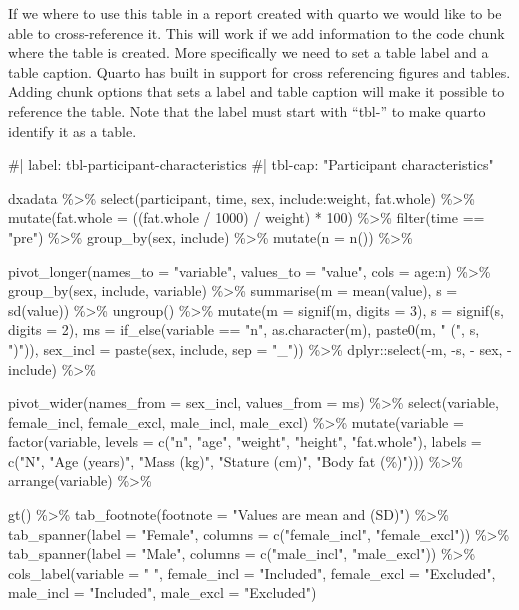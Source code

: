 \documentclass[
  11pt,
  letterpaper,
]{scrbook}
\newenvironment{Shaded}{\begin{snugshade}}{\end{snugshade}}
\newcommand{\NormalTok}[1]{\textcolor[rgb]{0.00,0.23,0.31}{#1}}
\begin{document}
If we where to use this table in a report created with quarto we would
like to be able to cross-reference it. This will work if we add
information to the code chunk where the table is created. More
specifically we need to set a table label and a table caption. Quarto
has built in support for cross referencing figures and tables. Adding
chunk options that sets a label and table caption will make it possible
to reference the table. Note that the label must start with ``tbl-'' to
make quarto identify it as a table.

\begin{Shaded}
\begin{Highlighting}[numbers=left,,]
\NormalTok{\#| label: tbl{-}participant{-}characteristics}
\NormalTok{\#| tbl{-}cap: "Participant characteristics"}

\NormalTok{dxadata \%\textgreater{}\%}
\NormalTok{select(participant, time, sex, include:weight, fat.whole) \%\textgreater{}\%}
\NormalTok{mutate(fat.whole = ((fat.whole / 1000) / weight) * 100) \%\textgreater{}\%}
\NormalTok{filter(time == "pre") \%\textgreater{}\%}
\NormalTok{group\_by(sex, include) \%\textgreater{}\%}
\NormalTok{mutate(n = n()) \%\textgreater{}\%}

\NormalTok{pivot\_longer(names\_to =  "variable", }
\NormalTok{             values\_to = "value", }
\NormalTok{             cols = age:n) \%\textgreater{}\%}
\NormalTok{group\_by(sex, include, variable) \%\textgreater{}\%}
\NormalTok{summarise(m = mean(value), }
\NormalTok{          s = sd(value)) \%\textgreater{}\%}
\NormalTok{ungroup() \%\textgreater{}\%}
\NormalTok{mutate(m = signif(m, digits = 3), }
\NormalTok{       s = signif(s, digits = 2), }
\NormalTok{       ms = if\_else(variable == "n", as.character(m), paste0(m, " (", s, ")")), }
\NormalTok{       sex\_incl = paste(sex, include, sep = "\_")) \%\textgreater{}\%}
\NormalTok{dplyr::select({-}m, {-}s, {-} sex, {-}include) \%\textgreater{}\%}

\NormalTok{pivot\_wider(names\_from = sex\_incl, }
\NormalTok{            values\_from = ms) \%\textgreater{}\%}
\NormalTok{select(variable, female\_incl, female\_excl, male\_incl, male\_excl) \%\textgreater{}\%}
\NormalTok{mutate(variable = factor(variable, levels = c("n", "age", "weight", "height", "fat.whole"), }
\NormalTok{                         labels = c("N", "Age (years)", "Mass (kg)", }
\NormalTok{                                    "Stature (cm)", "Body fat (\%)"))) \%\textgreater{}\%}
\NormalTok{arrange(variable) \%\textgreater{}\%}

\NormalTok{gt() \%\textgreater{}\%}
\NormalTok{tab\_footnote(footnote = "Values are mean and (SD)") \%\textgreater{}\%}
\NormalTok{tab\_spanner(label = "Female", columns = c("female\_incl", "female\_excl")) \%\textgreater{}\%}
\NormalTok{tab\_spanner(label = "Male", columns = c("male\_incl", "male\_excl")) \%\textgreater{}\%}
\NormalTok{cols\_label(variable = " ", }
\NormalTok{           female\_incl = "Included", }
\NormalTok{           female\_excl = "Excluded", }
\NormalTok{           male\_incl = "Included", }
\NormalTok{           male\_excl = "Excluded")}
           
\end{Highlighting}
\end{Shaded}
\end{document}
